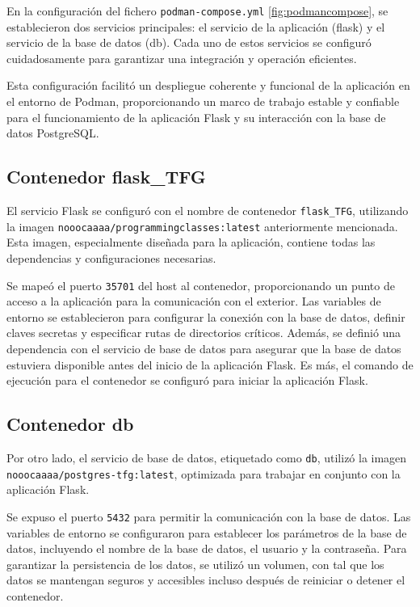 En la configuración del fichero \texttt{podman-compose.yml} \ref{fig:podmancompose}, se establecieron dos servicios principales: el servicio de la aplicación (flask) y el servicio de la base de datos (db). Cada uno de estos servicios se configuró cuidadosamente para garantizar una integración y operación eficientes. 

Esta configuración facilitó un despliegue coherente y funcional de la aplicación en el entorno de Podman, proporcionando un marco de trabajo estable y confiable para el funcionamiento de la aplicación Flask y su interacción con la base de datos PostgreSQL.

\subsection{Contenedor flask\_TFG}

El servicio Flask se configuró con el nombre de contenedor \texttt{flask\_TFG}, utilizando la imagen \texttt{nooocaaaa/programmingclasses:latest} anteriormente mencionada. Esta imagen, especialmente diseñada para la aplicación, contiene todas las dependencias y configuraciones necesarias. 

Se mapeó el puerto \texttt{35701} del host al contenedor, proporcionando un punto de acceso a la aplicación para la comunicación con el exterior. Las variables de entorno se establecieron para configurar la conexión con la base de datos, definir claves secretas y especificar rutas de directorios críticos. Además, se definió una dependencia con el servicio de base de datos para asegurar que la base de datos estuviera disponible antes del inicio de la aplicación Flask. Es más, el comando de ejecución para el contenedor se configuró para iniciar la aplicación Flask.

\subsection{Contenedor db}

Por otro lado, el servicio de base de datos, etiquetado como \texttt{db}, utilizó la imagen \texttt{nooocaaaa/postgres-tfg:latest}, optimizada para trabajar en conjunto con la aplicación Flask.

Se expuso el puerto \texttt{5432} para permitir la comunicación con la base de datos. Las variables de entorno se configuraron para establecer los parámetros de la base de datos, incluyendo el nombre de la base de datos, el usuario y la contraseña. Para garantizar la persistencia de los datos, se utilizó un volumen, con tal que los datos se mantengan seguros y accesibles incluso después de reiniciar o detener el contenedor.

